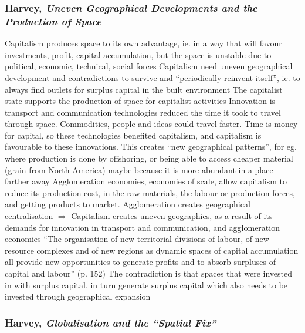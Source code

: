 \documentclass{article}
\begin{document}
\subsubsection{Harvey, \textit{Uneven Geographical Developments and the Production of Space}}

\begin{outline}
	\1 Capitalism produces space to its own advantage, ie. in a way that will favour investments, profit, capital accumulation, but the space is unstable due to political, economic, technical, social forces
	\1 Capitalism need uneven geographical development and contradictions to survive and ``periodically reinvent itself'', ie. to always find outlets for surplus capital in the built environment
	\1 The capitalist state supports the production of space for capitalist activities 
	\1 Innovation is transport and communication technologies reduced the time it took to travel through space. Commodities, people and ideas could travel faster. Time is money for capital, so these technologies benefited capitalism, and capitalism is favourable to these innovations. This creates ``new geographical patterns'', for eg. where production is done by offshoring, or being able to access cheaper material (grain from North America) maybe because it is more abundant in a place farther away
	\1 Agglomeration economies, economies of scale, allow capitalism to reduce its production cost, in the raw materials, the labour or production forces, and getting products to market. Agglomeration creates geographical centralisation
	\1 $\Rightarrow$ Capitalism creates uneven geographies, as a result of its demands for innovation in transport and communication, and agglomeration economies
	\1 ``The organisation of new territorial divisions of labour, of new resource complexes and of new regions as dynamic spaces of capital accumulation all provide new opportunities to generate profits and to absorb surpluses of capital and labour'' (p. 152)
	\1 The contradiction is that spaces that were invested in with surplus capital, in turn generate surplus capital which also needs to be invested through geographical expansion
\end{outline}


\subsubsection{Harvey, \textit{Globalisation and the ``Spatial Fix''}}

\begin{outline}
	\1
\end{outline}
\end{document}
